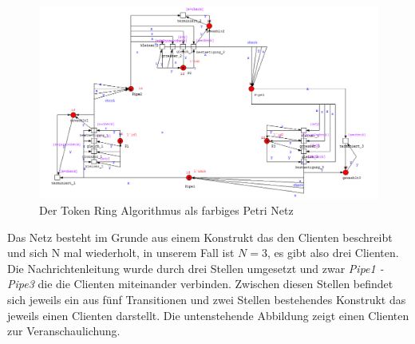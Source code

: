 \begin{figure}[H]
\centering
\includegraphics[width=1\linewidth]{kapitel/hauptteil/img/cpn}
\caption{Der Token Ring Algorithmus als farbiges Petri Netz}
\label{fig:cpn}
\end{figure}

Das Netz besteht im Grunde aus einem Konstrukt das den Clienten beschreibt und sich N mal wiederholt, in unserem Fall ist $N=3$, es gibt also drei Clienten. Die Nachrichtenleitung wurde durch drei Stellen umgesetzt und zwar \textit{Pipe1 - Pipe3} die die Clienten miteinander verbinden. Zwischen diesen Stellen befindet sich jeweils ein aus fünf Transitionen und zwei Stellen bestehendes Konstrukt das jeweils einen Clienten darstellt. Die untenstehende Abbildung zeigt einen Clienten zur Veranschaulichung. 


